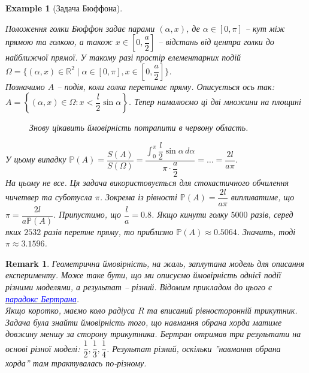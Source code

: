 \documentclass[a4paper, 10pt]{article}
\theoremstyle{theoremdd}
\newtheorem{example}[theorem]{Example}
\newtheorem{remark}[theorem]{Remark}
\begin{document}
\begin{example}[Задача Бюффона]
\begin{figure}[H]
\end{figure}
\noindent
Положення голки Бюффон задає парами $(\alpha,x)$, де $\alpha \in [0,\pi]$ -- кут між прямою та голкою, а також $x \in \left[0,\dfrac{a}{2}\right]$ -- відстань від центра голки до найближчої прямої. У такому разі простір елементарних подій $\Omega = \{ (\alpha,x) \in \mathbb{R}^2 \mid \alpha \in [0,\pi], x \in \left[0,\dfrac{a}{2}\right]  \}$.\\
Позначимо $A$ -- подія, коли голка перетинає пряму. Описується ось так: $A = \left\{(\alpha,x) \in \Omega: x < \dfrac{l}{2} \sin \alpha \right\}$. Тепер намалюємо ці дві множини на площині
\begin{figure}[H]
\centering
{}
\caption*{Знову цікавить ймовірність потрапити в червону область.}
\end{figure}
\noindent
У цьому випадку $\mathbb{P}(A) = \dfrac{S(A)}{S(\Omega)} = \dfrac{\displaystyle\int_0^\pi \dfrac{l}{2} \sin \alpha\,d\alpha}{\pi \cdot \dfrac{a}{2}} = \dots = \dfrac{2l}{a\pi}$.
\bigskip \\
На цьому не все. Ця задача використовується для стохастичного обчилення чичетвер та суботусла $\pi$. Зокрема із рівності $\mathbb{P}(A) = \dfrac{2l}{a\pi}$ випливатиме, що $\pi = \dfrac{2l}{a \mathbb{P}(A)}$. Припустимо, що $\dfrac{l}{a} = 0.8$. Якщо кинути голку $5000$ разів, серед яких $2532$ разів перетне пряму, то приблизно $\mathbb{P}(A) \approx 0.5064$. Значить, тоді $\pi \approx 3.1596$.
\end{example}

\begin{remark}
Геометрична ймовірність, на жаль, заплутана модель для описання експерименту. Може таке бути, що ми описуємо ймовірність однієї події різними моделями, а результат -- різний. Відомим прикладом до цього є \href{https://en.wikipedia.org/wiki/Bertrand_paradox_(probability)}{\textcolor{blue}{парадокс Бертрана}}. \\
Якщо коротко, маємо коло радіуса $R$ та вписаний рівносторонній трикутник. Задача була знайти ймовірність того, що навмання обрана хорда матиме довжину меншу за сторону трикутника. Бертран отримав три результати на основі різної моделі: $\dfrac{1}{2}, \dfrac{1}{3}, \dfrac{1}{4}$. Результат різний, оскільки ''навмання обрана хорда'' там трактувалась по-різному.
\end{remark}
\end{document}

